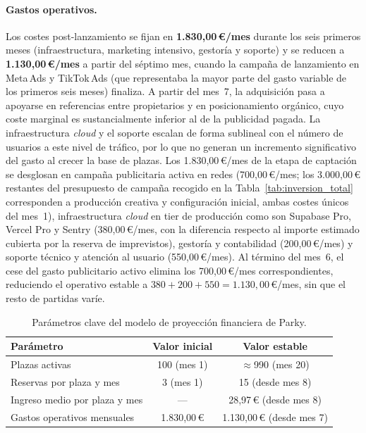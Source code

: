 \paragraph{Gastos operativos.} Los costes post-lanzamiento se fijan en \textbf{1.830,00\,€/mes} durante los seis primeros meses (infraestructura, marketing intensivo, gestoría y soporte) y se reducen a \textbf{1.130,00\,€/mes} a partir del séptimo mes, cuando la campaña de lanzamiento en Meta\,Ads y TikTok\,Ads (que representaba la mayor parte del gasto variable de los primeros seis meses) finaliza. A partir del mes~7, la adquisición pasa a apoyarse en referencias entre propietarios y en posicionamiento orgánico, cuyo coste marginal es sustancialmente inferior al de la publicidad pagada. La infraestructura \textit{cloud} y el soporte escalan de forma sublineal con el número de usuarios a este nivel de tráfico, por lo que no generan un incremento significativo del gasto al crecer la base de plazas. Los 1.830,00\,€/mes de la etapa de captación se desglosan en campaña publicitaria activa en redes (700,00\,€/mes; los 3.000,00\,€ restantes del presupuesto de campaña recogido en la Tabla~\ref{tab:inversion_total} corresponden a producción creativa y configuración inicial, ambas costes únicos del mes~1), infraestructura \textit{cloud} en tier de producción  como son Supabase Pro, Vercel Pro y Sentry (380,00\,€/mes, con la diferencia respecto al importe estimado cubierta por la reserva de imprevistos), gestoría y contabilidad (200,00\,€/mes) y soporte técnico y atención al usuario (550,00\,€/mes). Al término del mes~6, el cese del gasto publicitario activo elimina los 700,00\,€/mes correspondientes, reduciendo el operativo estable a $380 + 200 + 550 = 1.130{,}00$\,€/mes, sin que el resto de partidas varíe.

\begin{table}[H]
    \centering
    \renewcommand{\arraystretch}{1.2}
    \begin{tabular}{lcc}
        \toprule
        \textbf{Parámetro}            & \textbf{Valor inicial} & \textbf{Valor estable}    \\
        \midrule
        Plazas activas                & 100 (mes 1)            & $\approx$990 (mes 20)     \\
        Reservas por plaza y mes      & 3 (mes 1)              & 15 (desde mes 8)          \\
        Ingreso medio por plaza y mes & ---                    & 28,97\,€ (desde mes 8)    \\
        Gastos operativos mensuales   & 1.830,00\,€            & 1.130,00\,€ (desde mes 7) \\
        \bottomrule
    \end{tabular}
    \caption{Parámetros clave del modelo de proyección financiera de Parky.}
    \label{tab:hipotesis_roi}
\end{table}

